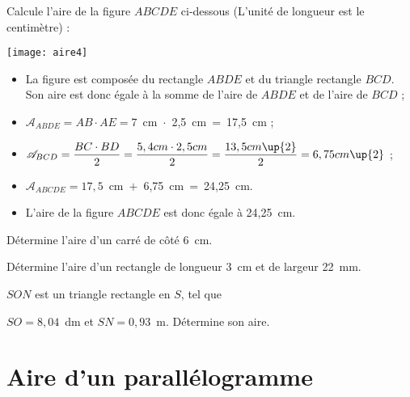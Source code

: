 \vspace{4em}

\begin{methode*1}

\begin{exemple*1}
Calcule l'aire de la figure $ABCDE$ ci‑dessous (L'unité de longueur est le centimètre) :
\begin{center}  \texttt{[image: aire4]} \end{center}

 \begin{itemize}
  \item La figure est composée du rectangle $ABDE$ et du triangle rectangle $BCD$. Son aire est donc égale à la somme de l'aire de $ABDE$ et de l'aire de $BCD$ ;
  \item $\mathcal{A}_{ABDE} = AB \cdot AE = 7$ cm $\cdot$ 2,5 cm = 17,5 cm ; \\[0.2em]
  \item $\mathcal{A}_{BCD} = \dfrac{BC \cdot BD}{2} = \dfrac{5,4 cm \cdot 2,5 cm}{2} = \dfrac{13,5 cm\up{2}}{2} = 6,75 cm\up{2}$ ;\\[0.2em]
  \item $\mathcal{A}_{ABCDE} = 17,5$ cm $+$ 6,75 cm = 24,25 cm.
  \item L'aire de la figure $ABCDE$ est donc égale à 24,25 cm.
  \end{itemize}
\end{exemple*1}

\exercice 
Détermine l'aire d'un carré de côté 6 cm. 

\exercice 
Détermine l'aire d'un rectangle de longueur 3 cm et de largeur 22 mm.
     
\exercice 
$SON$ est un triangle rectangle en $S$, tel que 

$SO = 8,04$ dm et $SN = 0,93$ m. Détermine son aire.
 
\end{methode*1}

\newpage

\section{Aire d'un parallélogramme}

\vspace{2em}


